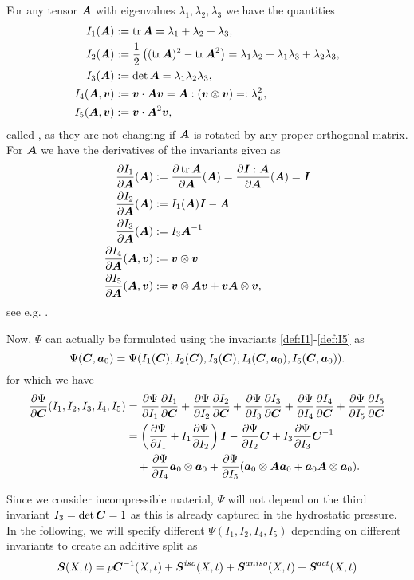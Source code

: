 For any tensor $\vA$ with eigenvalues $\lambda_1,\lambda_2,\lambda_3$ we have the quantities
\begin{align}
	I_1(\vA) &:= \tr\vA = \lambda_1 + \lambda_2 + \lambda_3,\label{def:I1}\\
	I_2(\vA) &:= \frac{1}{2}\left((\tr \vA)^2 - \tr\vA^2\right) = \lambda_1\lambda_2 + \lambda_1\lambda_3 + \lambda_2\lambda_3,\\
	I_3(\vA) &:= \det\vA = \lambda_1\lambda_2\lambda_3,\label{def:I3}\\
	I_4(\vA,\vv) &:= \vv\cdot\vA\vv = \vA : (\vv \otimes \vv)\label{def:I4} =: \lambda^2_{\vv},\\
	I_5(\vA,\vv) &:= \vv\cdot\vA^2\vv,\label{def:I5}
\end{align}
called , as they are not changing if $\vA$ is rotated by any proper orthogonal matrix.
For  $\vA$ we have the derivatives of the invariants given as
\begin{align}
	\d{I_1}{\vA}(\vA) &:= \d{\tr\vA}{\vA}(\vA) = \d{\vI:\vA}{\vA}(\vA) = \vI\\
	\d{I_2}{\vA}(\vA) &:= I_1(\vA)\vI - \vA\\
	\d{I_3}{\vA}(\vA) &:= I_3\vA^{-1}\\
	\d{I_4}{\vA}(\vA,\vv) &:= \vv \otimes \vv\label{def:dI4}\\
	\d{I_5}{\vA}(\vA,\vv) &:= \vv \otimes \vA\vv + \vv\vA \otimes \vv,
\end{align}
see e.g. \cite[p.216/p.268]{Holzapfel2000}.

Now, $\Psi$ can actually be formulated using the invariants \eqref{def:I1}-\eqref{def:I5} as
\[
	\Psi(\vC,\va_0) = \Psi(I_1(\vC),I_2(\vC),I_3(\vC),I_4(\vC,\va_0),I_5(\vC,\va_0)).
\]
for which we have
\begin{align}
	\d{\Psi}{\vC}(I_1,I_2,I_3,I_4,I_5) &=
		\d{\Psi}{I_1}\d{I_1}{\vC} + \d{\Psi}{I_2}\d{I_2}{\vC} + \d{\Psi}{I_3}\d{I_3}{\vC} + \d{\Psi}{I_4}\d{I_4}{\vC} + \d{\Psi}{I_5}\d{I_5}{\vC}\\
		&= \left(\d{\Psi}{I_1} + I_1\d{\Psi}{I_2}\right)\vI - \d{\Psi}{I_2}\vC + I_3\d{\Psi}{I_3}\vC^{-1}\\
		&\quad+ \d{\Psi}{I_4}\va_0\otimes\va_0 + \d{\Psi}{I_5}(\va_0\otimes\vA\va_0 + \va_0\vA\otimes\va_0).
\end{align}

Since we consider incompressible material, $\Psi$ will not depend on the third invariant $I_3 = \det\vC = 1$ as this is already captured in the hydrostatic pressure. 
In the following, we will specify different $\Psi(I_1,I_2,I_4,I_5)$ depending on different invariants to create an additive split as 
\begin{align}
	\vS(X,t) = p\vC^{-1}(X,t) + \vSi(X,t) + \vSa(X,t) + \vSf(X,t)\label{def:S_split}
\end{align}

